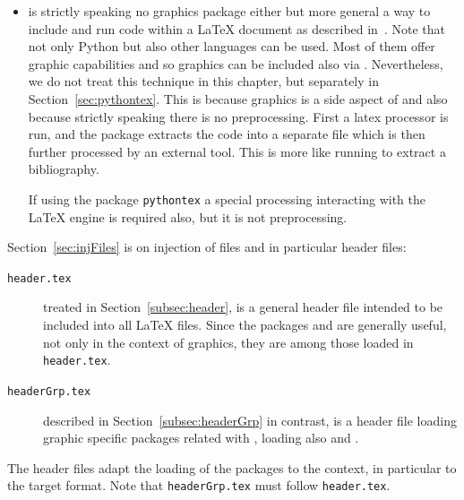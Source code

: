 \begin{itemize}
Even if the author does not use colors in graphics, 
several formats, like \gls{fig}, \gls{gp} and \gls{svg} 
offer it and so the according converters 
transforming them into the native formats 
create color information which can be rendered only via . 
In this sense its role is comparable to that of . 
On the other hand, the use of  is not specific to graphics. 
For details see~\cite{XColorP}. 
\item[\pkg{pythontex}]
is strictly speaking no graphics package either but more general 
a way to include and run code within a \LaTeX{} document 
as described in~\cite{PythonTexP}. 
Note that not only Python but also other languages can be used. 
Most of them offer graphic capabilities 
and so graphics can be included also via . 
Nevertheless, we do not treat this technique in this chapter, 
but separately in Section~\ref{sec:pythontex}. 
This is because graphics is a side aspect of  
and also because strictly speaking there is no preprocessing. 
First a latex processor is run, and the package extracts the code 
into a separate file which is then further processed by an external tool. 
This is more like running  to extract a bibliography. 

If using the package \texttt{pythontex} 
a special processing interacting with the \LaTeX{} engine is required also, 
but it is not preprocessing. 
\end{itemize}

Section~\ref{sec:injFiles} is on injection of files 
and in particular header files: 
%
\begin{description}
  \item[\texttt{header.tex}] treated in Section~\ref{subsec:header}, 
  is a general header file intended to be included into all \LaTeX{} files. 
  Since the packages  and  are generally useful, 
  not only in the context of graphics, they are among those loaded in \texttt{header.tex}. 
  \item[\texttt{headerGrp.tex}] described in Section~\ref{subsec:headerGrp} in contrast, 
  is a header file loading graphic specific packages related with , 
  loading also  and . 
\end{description}

The header files adapt the loading of the packages to the context, 
in particular to the target format. 
Note that \texttt{headerGrp.tex} must follow \texttt{header.tex}. 

